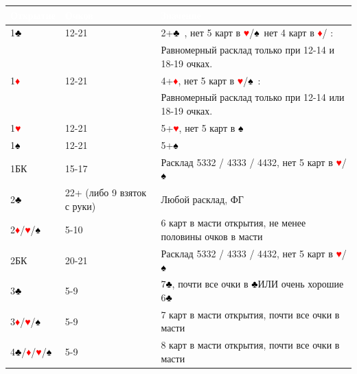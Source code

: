 \documentclass[a4paper,10pt]{article}
\newcommand{\clb}{\textcolor{black}{♣}}
\newcommand{\dia}{\textcolor{red}{♦}}
\newcommand{\hrt}{\textcolor{red}{♥}}
\newcommand{\spd}{\textcolor{black}{♠}}
\newcommand{\NT}{БК}
\begin{document}
\noindent
\begin{tabularx}{\textwidth}{|l|l|X|}
\hline
\rowcolor{tableHeader} \textcolor{white}{\textbf{Открытие}} & \textcolor{white}{\textbf{Очков}} & \textcolor{white}{\textbf{Значение}} \\ \hline
1\clb & 12-21 & 2+\clb\ , нет 5 карт в \hrt/\spd\, нет 4 карт в \dia/ : \\
      &       & Равномерный расклад только при 12-14 и 18-19 очках. \\ \hline
1\dia & 12-21 & 4+\dia, нет 5 карт в \hrt/\spd\ : \\
      &       & Равномерный расклад только при 12-14 или 18-19 очках. \\ \hline
1\hrt & 12-21 & 5+\hrt, нет 5 карт в \spd \\ \hline
1\spd & 12-21 & 5+\spd \\ \hline
1\NT  & 15-17 & Расклад 5332 / 4333 / 4432, нет 5 карт в \hrt/\spd \\ \hline
2\clb & 22+ (либо 9 взяток с руки)  & Любой расклад, ФГ \\ \hline
2\dia/\hrt/\spd & 5-10 & 6 карт в масти открытия, не менее половины очков в масти \\ \hline
2\NT  & 20-21 & Расклад 5332 / 4333 / 4432, нет 5 карт в \hrt/\spd \\ \hline
3\clb & 5-9 & 7\clb, почти все очки в \clb ИЛИ очень хорошие 6\clb \\ \hline
3\dia/\hrt/\spd & 5-9 & 7 карт в масти открытия, почти все очки в масти \\ \hline
4\clb/\dia/\hrt/\spd & 5-9 & 8 карт в масти открытия, почти все очки в масти \\ \hline
\end{tabularx}
\end{document}
